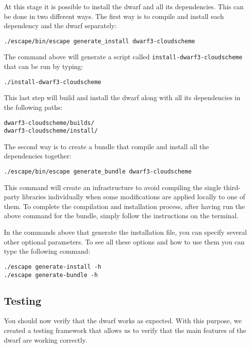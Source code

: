 \documentclass[
a4paper,     %
12pt,        %
article,
onecolumn,   %
openany,     %
]{memoir}
\newcommand{\inlsh}[1]{\texttt{#1}}
\newcommand{\inlsh}[1]{\tikz[anchor=base,baseline]\node[inner sep=2pt,
outer sep=0,draw=yellow!10,fill=yellow!10]{\texttt{#1}};}
\begin{document}
At this stage it is possible to install the dwarf 
and all its dependencies. This can be done in two 
different ways. The first way is to compile and 
install each dependency and the dwarf separately:
%
\begin{lstlisting}[style=BashStyle]
./escape/bin/escape generate_install dwarf3-cloudscheme
\end{lstlisting}
% 
The command above will generate a script 
called \inlsh{install-dwarf3-cloudscheme} 
that can be run by typing:
%
\begin{lstlisting}[style=BashStyle]
./install-dwarf3-cloudscheme
\end{lstlisting}
%
This last step will build and install the dwarf 
along with all its dependencies in the following 
paths:
%
\begin{lstlisting}[style=BashStyle]
dwarf3-cloudscheme/builds/
dwarf3-cloudscheme/install/
\end{lstlisting}
%

The second way is to create a bundle that compile 
and install all the dependencies together:
%
\begin{lstlisting}[style=BashStyle]
./escape/bin/escape generate_bundle dwarf3-cloudscheme
\end{lstlisting}
% 
This command will create an infrastructure to avoid
compiling the single third-party libraries individually
when some modifications are applied locally to one of 
them. To complete the compilation and installation process, 
after having run the above command for the bundle, simply 
follow the instructions on the terminal.

In the commands above that generate the installation 
file, you can specify several other optional parameters. 
To see all these options and how to use them you 
can type the following command:
%
\begin{lstlisting}[style=BashStyle]
./escape generate-install -h
./escape generate-bundle -h
\end{lstlisting}
%

\subsection{Testing}
You should now verify that the dwarf works as expected.
With this purpose, we created a testing framework that
allows us to verify that the main features of the dwarf 
are working correctly.
\end{document}

